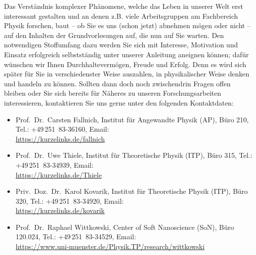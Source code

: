 \begin{multicols}{2}
Das Verständnis komplexer Phänomene, welche das Leben in unserer Welt erst interessant gestalten und an denen z.B. viele  Arbeitsgruppen am Fachbereich Physik forschen, baut -- ob Sie es uns (schon jetzt) abnehmen mögen oder nicht -- auf den Inhalten der Grundvorlesungen auf, die nun auf Sie warten. Den notwendigen Stoffumfang dazu werden Sie sich mit Interesse, Motivation und Einsatz erfolgreich selbstständig unter unserer Anleitung aneignen können; dafür wünschen wir Ihnen Durchhaltevermögen, Freude und Erfolg. Denn es wird sich später für Sie in verschiedenster Weise auszahlen, in physikalischer Weise denken und handeln zu können. Sollten dann doch noch zwischendrin Fragen offen bleiben oder Sie sich bereits für Näheres zu unseren Forschungsarbeiten interessieren, kontaktieren Sie uns gerne unter den folgenden Kontaktdaten:\\

\begin{itemize}
\item Prof.\ Dr.\ Carsten Fallnich, Institut für Angewandte Physik (AP), Büro 210, Tel.: +49\,251~83-36160, Email:  \\ \url{https://kurzelinks.de/fallnich} 

\item Prof.\ Dr.\ Uwe Thiele, Institut für Theoretische Physik (ITP), Büro 315,  Tel.: +49\,251~83-34939, Email:  \\ \url{https://kurzelinks.de/Thiele} 

\item Priv.\ Doz.\ Dr.\ Karol Kovarik, Institut für Theoretische Physik (ITP), Büro 320, Tel.: +49\,251~83-34920, Email:  \\ \url{https://kurzelinks.de/kovarik} 

\item Prof.\ Dr.\ Raphael Wittkowski, Center of Soft Nanoscience (SoN), Büro 120.024, Tel.: +49\,251~83-34529, Email:  \\ \url{https://www.uni-muenster.de/Physik.TP/research/wittkowski} 
\end{itemize}


\end{multicols}

